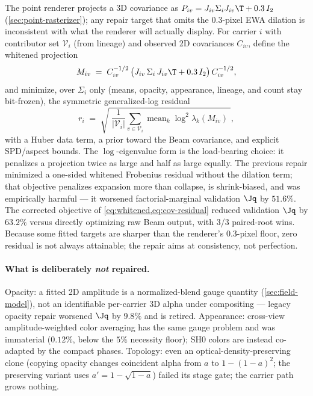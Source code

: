 The point renderer projects a 3D covariance as $P_{iv} = J_{iv} \Sigma_i J_{iv}\T + 0.3\,
I_2$ (\cref{sec:point-rasterizer}); any repair target that omits the $0.3$-pixel EWA dilation
is inconsistent with what the renderer will actually display.  For carrier $i$ with
contributor set $\mathcal{V}_i$ (from lineage) and observed 2D covariances $C_{iv}$, define
the whitened projection
\begin{equation}
  M_{iv} \;=\; C_{iv}^{-1/2}\,\big(J_{iv}\, \Sigma_i\, J_{iv}\T + 0.3\, I_2\big)\,
               C_{iv}^{-1/2},
  \label{eq:whitened}
\end{equation}
and minimize, over $\Sigma_i$ only (means, opacity, appearance, lineage, and count stay
bit-frozen), the symmetric generalized-log residual
\begin{equation}
  r_i \;=\; \sqrt{\;\frac{1}{|\mathcal{V}_i|}\sum_{v \in \mathcal{V}_i}
        \operatorname{mean}_k \log^2 \lambda_k(M_{iv})\;},
  \label{eq:cov-residual}
\end{equation}
with a Huber data term, a prior toward the Beam covariance, and explicit SPD/aspect bounds.
The $\log$-eigenvalue form is the load-bearing choice: it penalizes a projection twice as
large and half as large equally.  The previous repair minimized a one-sided whitened
Frobenius residual without the dilation term; that objective penalizes expansion more than
collapse, is shrink-biased, and was empirically harmful --- it worsened factorial-marginal
validation $\Jq$ by $51.6\%$.  The corrected objective of
\cref{eq:whitened,eq:cov-residual} reduced validation $\Jq$ by $63.2\%$ versus directly
optimizing raw Beam output, with 3/3 paired-root wins.
Because some fitted targets are sharper than the renderer's $0.3$-pixel floor, zero residual
is not always attainable; the repair aims at consistency, not perfection.

\paragraph{What is deliberately \emph{not} repaired.}
Opacity: a fitted 2D amplitude is a normalized-blend gauge quantity
(\cref{sec:field-model}), not an identifiable per-carrier 3D alpha under compositing ---
legacy opacity repair worsened $\Jq$ by $9.8\%$ and is retired.  Appearance: cross-view
amplitude-weighted color averaging has the same gauge problem and was immaterial ($0.12\%$,
below the $5\%$ necessity floor); SH0 colors are instead co-adapted by the compact phases.
Topology: even an optical-density-preserving clone (copying opacity changes coincident alpha
from $a$ to $1-(1-a)^2$; the preserving variant uses $a' = 1 - \sqrt{1-a}$) failed its stage
gate; the carrier path grows nothing.

